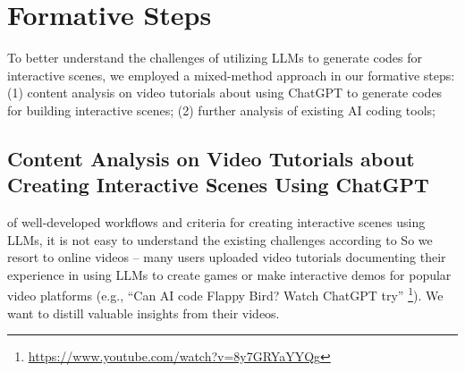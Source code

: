 \section{Formative Steps}

To better understand the challenges of utilizing LLMs to generate codes for interactive scenes, we employed a {mixed-method} %
approach in our formative steps: (1) content analysis on {video tutorials} %
about using ChatGPT to generate codes for building interactive scenes; (2) further analysis {of} %
existing AI coding tools; 

\subsection{Content Analysis on {Video Tutorials} %
about Creating Interactive Scenes Using ChatGPT}
\label{sec:content_analysis}
 of well-developed workflows and criteria for creating interactive scenes using LLMs, it is not easy to understand the existing challenges according to  %
So we resort to online videos -- many users uploaded %
video tutorials {documenting their} %
experience in using LLMs to create games or make interactive demos for popular video platforms (e.g., {``Can AI code Flappy Bird? Watch ChatGPT try''}%
\footnote[3]{\url{https://www.youtube.com/watch?v=8y7GRYaYYQg}}). We want to distill valuable insights from their videos.



